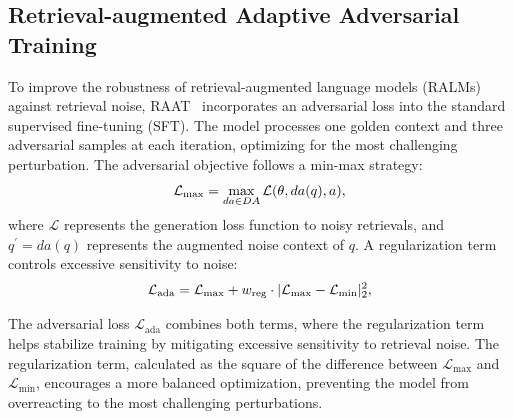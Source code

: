 \subsection{Retrieval-augmented Adaptive Adversarial Training}
To improve the robustness of retrieval-augmented language models (RALMs) against retrieval noise, RAAT~\cite{fang-etal-2024-enhancing} incorporates an adversarial loss into the standard supervised fine-tuning (SFT). The model processes one golden context and three adversarial samples at each iteration, optimizing for the most challenging perturbation. The adversarial objective follows a min-max strategy:
\begin{equation}
\textstyle
\setlength\abovedisplayskip{0.2cm}
\setlength\belowdisplayskip{0.2cm}
\begin{aligned}
\mathcal{L}_{\text{max}} = \max_{da \in DA} \mathcal{L}(\theta, da(q), a),
\end{aligned}
\end{equation}
where $\mathcal{L}$ represents the generation loss function to noisy retrievals, and $q^{\prime}=da(q)$ represents the augmented noise context of $q$. A regularization term controls excessive sensitivity to noise:
\begin{equation}
\textstyle
\setlength\abovedisplayskip{0.2cm}
\setlength\belowdisplayskip{0.2cm}
\begin{aligned}
\mathcal{L}_{\text{ada}} = \mathcal{L}_{\text{max}} + w_{\text{reg}} \cdot |\mathcal{L}_{\text{max}} - \mathcal{L}_{\text{min}}|_2^2,
\end{aligned}
\end{equation}

The adversarial loss $\mathcal{L}_{\text{ada}}$ combines both terms, where the regularization term helps stabilize training by mitigating excessive sensitivity to retrieval noise. The regularization term, calculated as the square of the difference between $\mathcal{L}_{\text{max}}$ and $\mathcal{L}_{\text{min}}$, encourages a more balanced optimization, preventing the model from overreacting to the most challenging perturbations.

